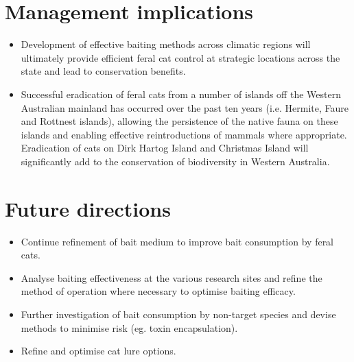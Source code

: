 \documentclass[version=last,
    paper=a4, %
    10pt, %
    usenames,
    dvipsnames,
    oneside, %
    headings=openany, %
    DIV=15 %
]{scrbook}
\begin{document}
\section*{Management implications}
\begin{itemize}
\itemsep1pt\parskip0pt
\item
  Development of effective baiting methods across climatic regions will
  ultimately provide efficient feral cat control at strategic locations
  across the state and lead to conservation benefits.
\item
  Successful eradication of feral cats from a number of islands off the
  Western Australian mainland has occurred over the past ten years (i.e.
  Hermite, Faure and Rottnest islands), allowing the persistence of the
  native fauna on these islands and enabling effective reintroductions
  of mammals where appropriate. Eradication of cats on Dirk Hartog
  Island and Christmas Island will significantly add to the conservation
  of biodiversity in Western Australia.
\end{itemize}



\section*{Future directions}
\begin{itemize}
\itemsep1pt\parskip0pt
\item
  Continue refinement of bait medium to improve bait consumption by
  feral cats.
\item
  Analyse baiting effectiveness at the various research sites and refine
  the method of operation where necessary to optimise baiting efficacy.
\item
  Further investigation of bait consumption by non-target species and
  devise methods to minimise risk (eg. toxin encapsulation).
\item
  Refine and optimise cat lure options.
\end{itemize}



\end{document}
